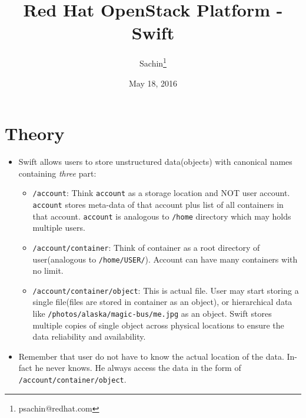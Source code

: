 \documentclass{article}
\author{Sachin\thanks{psachin@redhat.com}}
\date{May 18, 2016}
\title{Red Hat OpenStack Platform - Swift}
\begin{document}
\maketitle

\section{Theory}
\label{sec-1}
\begin{itemize}
\item Swift allows users to store unstructured data(objects) with
canonical names containing \emph{three} part:
\begin{itemize}
\item \texttt{/account}: Think \texttt{account} as a storage location and NOT user
account. \texttt{account} stores meta-data of that account plus list
of all containers in that account. \texttt{account} is analogous to
\texttt{/home} directory which may holds multiple users.

\item \texttt{/account/container}: Think of container as a root directory
of user(analogous to \texttt{/home/USER/}). Account can have many
containers with no limit.

\item \texttt{/account/container/object}: This is actual file. User may
start storing a single file(files are stored in container as
an object), or hierarchical data like \newline
\texttt{/photos/alaska/magic-bus/me.jpg} as an object. Swift stores
multiple copies of single object across physical locations to
ensure the data reliability and availability.
\end{itemize}

\item Remember that user do not have to know the actual location of the
data. In-fact he never knows. He always access the data in the
form of \texttt{/account/container/object}.
\end{itemize}
\end{document}
